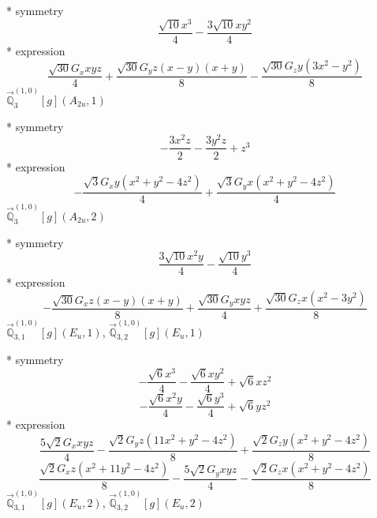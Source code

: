\documentclass[fleqn,8pt]{jsarticle}
\begin{document}
\noindent\quad ** symmetry
\begin{dmath*}
\frac{\sqrt{10} x^{3}}{4} - \frac{3 \sqrt{10} x y^{2}}{4}
\end{dmath*}
\noindent\quad ** expression
\begin{dmath*}
\frac{\sqrt{30} G_{x} x y z}{4} + \frac{\sqrt{30} G_{y} z \left(x - y\right) \left(x + y\right)}{8} - \frac{\sqrt{30} G_{z} y \left(3 x^{2} - y^{2}\right)}{8}
\end{dmath*}
\noindent\quad $\vec{\mathbb{Q}}_{3}^{(1,0)}[g](A_{2u},1)$

\noindent\quad ** symmetry
\begin{dmath*}
- \frac{3 x^{2} z}{2} - \frac{3 y^{2} z}{2} + z^{3}
\end{dmath*}
\noindent\quad ** expression
\begin{dmath*}
- \frac{\sqrt{3} G_{x} y \left(x^{2} + y^{2} - 4 z^{2}\right)}{4} + \frac{\sqrt{3} G_{y} x \left(x^{2} + y^{2} - 4 z^{2}\right)}{4}
\end{dmath*}
\noindent\quad $\vec{\mathbb{Q}}_{3}^{(1,0)}[g](A_{2u},2)$

\noindent\quad ** symmetry
\begin{dmath*}
\frac{3 \sqrt{10} x^{2} y}{4} - \frac{\sqrt{10} y^{3}}{4}
\end{dmath*}
\noindent\quad ** expression
\begin{dmath*}
- \frac{\sqrt{30} G_{x} z \left(x - y\right) \left(x + y\right)}{8} + \frac{\sqrt{30} G_{y} x y z}{4} + \frac{\sqrt{30} G_{z} x \left(x^{2} - 3 y^{2}\right)}{8}
\end{dmath*}
\noindent\quad $\vec{\mathbb{Q}}_{3,1}^{(1,0)}[g](E_{u},1)$, $\vec{\mathbb{Q}}_{3,2}^{(1,0)}[g](E_{u},1)$

\noindent\quad ** symmetry
\begin{dmath*}
- \frac{\sqrt{6} x^{3}}{4} - \frac{\sqrt{6} x y^{2}}{4} + \sqrt{6} x z^{2}
\end{dmath*}
\begin{dmath*}
- \frac{\sqrt{6} x^{2} y}{4} - \frac{\sqrt{6} y^{3}}{4} + \sqrt{6} y z^{2}
\end{dmath*}
\noindent\quad ** expression
\begin{dmath*}
\frac{5 \sqrt{2} G_{x} x y z}{4} - \frac{\sqrt{2} G_{y} z \left(11 x^{2} + y^{2} - 4 z^{2}\right)}{8} + \frac{\sqrt{2} G_{z} y \left(x^{2} + y^{2} - 4 z^{2}\right)}{8}
\end{dmath*}
\begin{dmath*}
\frac{\sqrt{2} G_{x} z \left(x^{2} + 11 y^{2} - 4 z^{2}\right)}{8} - \frac{5 \sqrt{2} G_{y} x y z}{4} - \frac{\sqrt{2} G_{z} x \left(x^{2} + y^{2} - 4 z^{2}\right)}{8}
\end{dmath*}
\noindent\quad $\vec{\mathbb{Q}}_{3,1}^{(1,0)}[g](E_{u},2)$, $\vec{\mathbb{Q}}_{3,2}^{(1,0)}[g](E_{u},2)$
\end{document}
